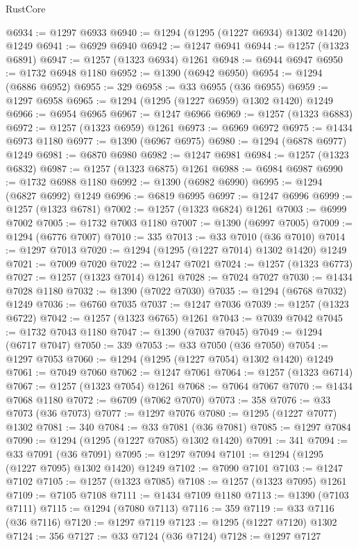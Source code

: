 \begin{lexlean}{RustCore}
\begin{coremodule}
@6934 := @1297 @6933
@6940 := @1294 (@1295 (@1227 @6934) @1302 @1420) @1249
@6941 := @6929 @6940
@6942 := @1247 @6941
@6944 := @1257 (@1323 @6891)
@6947 := @1257 (@1323 @6934) @1261
@6948 := @6944 @6947
@6950 := @1732 @6948 @1180
@6952 := @1390 (@6942 @6950)
@6954 := @1294 (@6886 @6952)
@6955 := 329
@6958 := @33 @6955 (@36 @6955)
@6959 := @1297 @6958
@6965 := @1294 (@1295 (@1227 @6959) @1302 @1420) @1249
@6966 := @6954 @6965
@6967 := @1247 @6966
@6969 := @1257 (@1323 @6883)
@6972 := @1257 (@1323 @6959) @1261
@6973 := @6969 @6972
@6975 := @1434 @6973 @1180
@6977 := @1390 (@6967 @6975)
@6980 := @1294 (@6878 @6977) @1249
@6981 := @6870 @6980
@6982 := @1247 @6981
@6984 := @1257 (@1323 @6832)
@6987 := @1257 (@1323 @6875) @1261
@6988 := @6984 @6987
@6990 := @1732 @6988 @1180
@6992 := @1390 (@6982 @6990)
@6995 := @1294 (@6827 @6992) @1249
@6996 := @6819 @6995
@6997 := @1247 @6996
@6999 := @1257 (@1323 @6781)
@7002 := @1257 (@1323 @6824) @1261
@7003 := @6999 @7002
@7005 := @1732 @7003 @1180
@7007 := @1390 (@6997 @7005)
@7009 := @1294 (@6776 @7007)
@7010 := 335
@7013 := @33 @7010 (@36 @7010)
@7014 := @1297 @7013
@7020 := @1294 (@1295 (@1227 @7014) @1302 @1420) @1249
@7021 := @7009 @7020
@7022 := @1247 @7021
@7024 := @1257 (@1323 @6773)
@7027 := @1257 (@1323 @7014) @1261
@7028 := @7024 @7027
@7030 := @1434 @7028 @1180
@7032 := @1390 (@7022 @7030)
@7035 := @1294 (@6768 @7032) @1249
@7036 := @6760 @7035
@7037 := @1247 @7036
@7039 := @1257 (@1323 @6722)
@7042 := @1257 (@1323 @6765) @1261
@7043 := @7039 @7042
@7045 := @1732 @7043 @1180
@7047 := @1390 (@7037 @7045)
@7049 := @1294 (@6717 @7047)
@7050 := 339
@7053 := @33 @7050 (@36 @7050)
@7054 := @1297 @7053
@7060 := @1294 (@1295 (@1227 @7054) @1302 @1420) @1249
@7061 := @7049 @7060
@7062 := @1247 @7061
@7064 := @1257 (@1323 @6714)
@7067 := @1257 (@1323 @7054) @1261
@7068 := @7064 @7067
@7070 := @1434 @7068 @1180
@7072 := @6709 (@7062 @7070)
@7073 := 358
@7076 := @33 @7073 (@36 @7073)
@7077 := @1297 @7076
@7080 := @1295 (@1227 @7077) @1302
@7081 := 340
@7084 := @33 @7081 (@36 @7081)
@7085 := @1297 @7084
@7090 := @1294 (@1295 (@1227 @7085) @1302 @1420)
@7091 := 341
@7094 := @33 @7091 (@36 @7091)
@7095 := @1297 @7094
@7101 := @1294 (@1295 (@1227 @7095) @1302 @1420) @1249
@7102 := @7090 @7101
@7103 := @1247 @7102
@7105 := @1257 (@1323 @7085)
@7108 := @1257 (@1323 @7095) @1261
@7109 := @7105 @7108
@7111 := @1434 @7109 @1180
@7113 := @1390 (@7103 @7111)
@7115 := @1294 (@7080 @7113)
@7116 := 359
@7119 := @33 @7116 (@36 @7116)
@7120 := @1297 @7119
@7123 := @1295 (@1227 @7120) @1302
@7124 := 356
@7127 := @33 @7124 (@36 @7124)
@7128 := @1297 @7127

\end{coremodule}
\end{lexlean}
